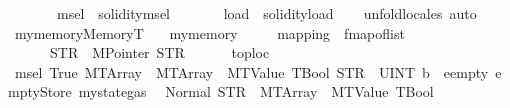 \begin{isabellebody}
\ \ \ \ \ \ \ msel\ {\isacharequal}{\kern0pt}\ solidity{\isachardot}{\kern0pt}msel\isanewline
\ \ \ \ \ \ \ load\ {\isacharequal}{\kern0pt}\ solidity{\isachardot}{\kern0pt}load\isanewline
%
\isadelimproof
\ \ %
\endisadelimproof
%
\isatagproof
{}\isamarkupfalse%
\ unfold{\isacharunderscore}{\kern0pt}locales\ auto%
\endisatagproof
{\isafoldproof}%
%
\isadelimproof
%
\endisadelimproof
%
\isadelimdocument
%
\endisadelimdocument
%
\isatagdocument
%
\isamarkuptrue%
%
\isamarkuptrue%
%
\endisatagdocument
{\isafolddocument}%
%
\isadelimdocument
%
\endisadelimdocument
{}\isamarkupfalse%
\ mymemory{}{\isacharcolon}{\kern0pt}{\isacharcolon}{\kern0pt}MemoryT\isanewline
\ \ \ {\isachardoublequoteopen}mymemory{}\ {\isasymequiv}\isanewline
\ \ \ \ {\isasymlparr}mapping\ {\isacharequal}{\kern0pt}\ fmap{\isacharunderscore}{\kern0pt}of{\isacharunderscore}{\kern0pt}list\isanewline
\ \ \ \ \ \ {\isacharbrackleft}{\kern0pt}{\isacharparenleft}{\kern0pt}STR\ {\isacharprime}{\kern0pt}{\isacharprime}{\kern0pt}{}{\isachardot}{\kern0pt}{}{\isacharprime}{\kern0pt}{\isacharprime}{\kern0pt}{\isacharcomma}{\kern0pt}\ MPointer\ STR\ {\isacharprime}{\kern0pt}{\isacharprime}{\kern0pt}{}{\isacharprime}{\kern0pt}{\isacharprime}{\kern0pt}{\isacharparenright}{\kern0pt}{\isacharbrackright}{\kern0pt}{\isacharcomma}{\kern0pt}\isanewline
\ \ \ \ \ toploc\ {\isacharequal}{\kern0pt}\ {}{\isasymrparr}{\isachardoublequoteclose}\isanewline
\isanewline
{}\isamarkupfalse%
\ {\isachardoublequoteopen}msel\ True\ {\isacharparenleft}{\kern0pt}MTArray\ {}\ {\isacharparenleft}{\kern0pt}MTArray\ {}\ {\isacharparenleft}{\kern0pt}MTValue\ TBool{\isacharparenright}{\kern0pt}{\isacharparenright}{\kern0pt}{\isacharparenright}{\kern0pt}\ {\isacharparenleft}{\kern0pt}STR\ {\isacharprime}{\kern0pt}{\isacharprime}{\kern0pt}{}{\isacharprime}{\kern0pt}{\isacharprime}{\kern0pt}{\isacharparenright}{\kern0pt}\ {\isacharbrackleft}{\kern0pt}UINT\ b{}\ {}{\isacharbrackright}{\kern0pt}\ eempty\ emptyStore\ {\isacharparenleft}{\kern0pt}mystate{\isasymlparr}gas{\isacharcolon}{\kern0pt}{\isacharequal}{\kern0pt}{}{\isasymrparr}{\isacharparenright}{\kern0pt}\ {}\isanewline
{\isacharequal}{\kern0pt}\ Normal\ {\isacharparenleft}{\kern0pt}{\isacharparenleft}{\kern0pt}STR\ {\isacharprime}{\kern0pt}{\isacharprime}{\kern0pt}{}{\isachardot}{\kern0pt}{}{\isacharprime}{\kern0pt}{\isacharprime}{\kern0pt}{\isacharcomma}{\kern0pt}\ MTArray\ {}\ {\isacharparenleft}{\kern0pt}MTValue\ TBool{\isacharparenright}{\kern0pt}{\isacharparenright}{\kern0pt}{\isacharcomma}{\kern0pt}\ {}{\isacharparenright}{\kern0pt}{\isachardoublequoteclose}\isanewline

\end{isabellebody}
